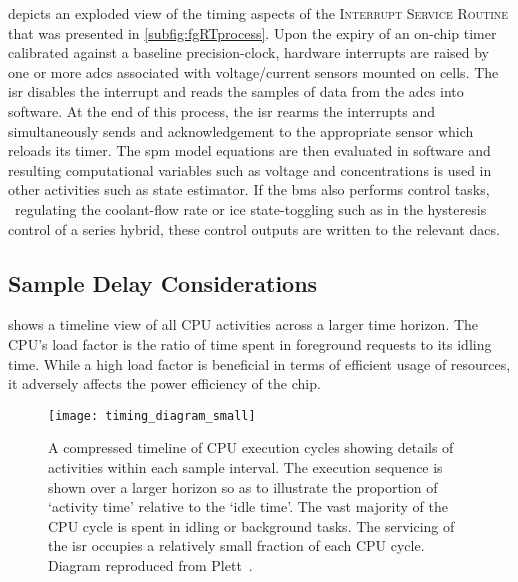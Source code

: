    depicts   an   exploded   view   of   the   timing
aspects  of  the  \textsc{Interrupt  Service  Routine}  that  was  presented  in
\cref{subfig:fgRTprocess}.  Upon  the  expiry  of an  on-chip  timer  calibrated
against a  baseline precision-clock,  hardware interrupts are  raised by  one or
more \glspl{adc} associated  with voltage/current sensors mounted  on cells. The
\gls{isr}  disables  the interrupt  and  reads  the  samples  of data  from  the
\glspl{adc} into software. At the end  of this process, the \gls{isr} rearms the
interrupts  and  simultaneously sends  and  acknowledgement  to the  appropriate
sensor  which  reloads  its  timer.  The  \gls{spm}  model  equations  are  then
evaluated in software and resulting  computational variables such as voltage and
concentrations  is used  in other  activities such  as state  estimator. If  the
\gls{bms} also performs control tasks, \eg{}~regulating the coolant-flow rate or
\gls{ice} state-toggling such  as in the hysteresis control of  a series hybrid,
these control outputs are written to the relevant \glspl{dac}.



\subsection{Sample Delay Considerations}

 shows a timeline view of all CPU activities across
a larger  time horizon.  The CPU's  load factor is  the ratio  of time  spent in
foreground requests to  its idling time. While a high  load factor is beneficial
in  terms of  efficient  usage  of resources,  it  adversely  affects the  power
efficiency of the chip.

\begin{figure}[!htbp]
    \centering
    \texttt{[image: timing\_diagram\_small]}
    \caption[Timeline of  activities over multiple CPU cycles of a real-time
    controller]{A compressed timeline of CPU execution cycles showing details of
        activities within each sample interval. The execution sequence is shown
        over a larger horizon so as to illustrate the proportion of `activity
        time' relative to the `idle time'. The vast majority of the CPU cycle is
        spent in idling or background tasks. The servicing of the \gls{isr}
        occupies a relatively small fraction of each CPU cycle. Diagram
    reproduced from Plett~\cite{PlettECE5540_02}.}
    \label{fig:timingdiagramSmall}
\end{figure}


